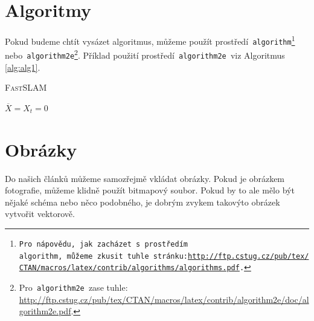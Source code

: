 \documentclass[a4paper, 11pt]{article}
\begin{document}
\section{Algoritmy}\label{sec:alg}
Pokud budeme chtít vysázet algoritmus, můžeme použít prostředí\texttt{ algorithm\footnote{\mbox{Pro nápovědu, jak zacházet s~prostředím\texttt{ algorithm,} můžeme zkusit tuhle stránku:}\linebreak \href{http://ftp.cstug.cz/pub/tex/CTAN/macros/latex/contrib/algorithms/algorithms.pdf}{http://ftp.cstug.cz/pub/tex/CTAN/macros/latex/contrib/algorithms/algorithms.pdf}.} } nebo\texttt{ algorithm2e}\footnote{Pro\texttt{ algorithm2e }zase tuhle: \href{http://ftp.cstug.cz/pub/tex/CTAN/macros/latex/contrib/algorithm2e/doc/algorithm2e.pdf}{http://ftp.cstug.cz/pub/tex/CTAN/macros/latex/contrib/algorithm2e/doc/algorithm2e.pdf}.}. Příklad použití prostředí\texttt{ algorithm2e }viz Algoritmus \ref{alg:alg1}. \\

\bigskip

\setlength{\algomargin}{3.25em}
\renewcommand*{\algorithmcfname}{Algoritmus}
\begin{algorithm}[H]\label{alg:alg1}
\caption{\textsc{Fast}SLAM}
\SetAlgoNoLine
\DontPrintSemicolon
\SetNlSty{}{}{:}
\SetNlSkip{0.4em}
\Indm
\BlankLine
\Indp
$\overline{X} = X_t = 0$\;
\;
\end{algorithm}

\vspace{\baselineskip}


\section{Obrázky}
Do našich článků můžeme samozřejmě vkládat obrázky. Pokud je obrázkem fotografie, můžeme klidně použít bitmapový soubor. Pokud by to ale mělo být nějaké schéma nebo něco podobného, je dobrým zvykem takovýto obrázek vytvořit vektorově.
\end{document}
